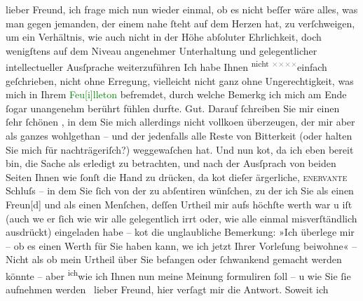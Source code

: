 \pstart
           lieber Freund, ich frage mich nun wieder einmal, ob es nicht beſſer
               wäre alles, was man gegen jemanden, der einem nahe ſteht auf dem Herzen hat, zu
               verſchweigen, um ein Verhältnis, wie auch nicht in der Höhe abſoluter Ehrlichkeit,
               doch wenigſtens auf dem Niveau angenehmer Unterhaltung {\pb}und gelegentlicher intellectueller Ausſprache
                  weiterzuführen{\dotstwo} Ich habe Ihnen \substVorne{}\textsuperscript{nicht \textcolor{gray}{×}\-\textcolor{gray}{×}\-\textcolor{gray}{×}\-\textcolor{gray}{×}}{\allowbreak}\substDazwischen{}einfach geſchrie\substHinten{}ben, nicht ohne Erregung, vielleicht nicht ganz ohne Ungerechtigkeit, was
               mich in Ihrem \textcolor{green}{Feu{[}i{]}lleton}{}\ledrightnote{{$\rightarrow$}\textcolor{green}{Arthur Schnitzler und sein »Reigen«}} befremdet, durch welche Bemerkg ich mich
               am Ende ſogar unangenehm berührt fühlen durfte. Gut. Darauf ſchreiben Sie mir einen
               ſehr {\pb}ſchönen \label{K_L02989-1v}\label{K_L02989-1h}, in dem Sie mich allerdings nicht vollko{\geminationm}en
               überzeugen, der mir aber als ganzes wohlgethan – und der jedenfalls alle Reste von
               Bitterkeit (oder halten Sie mich für nachträgeriſch?) weggewaſchen hat. Und nun ko{\geminationm}t, da ich eben bereit bin, die Sache als erledigt zu
               betrachten, und nach der Ausſprach von beiden Seiten {\pb}Ihnen wie ſonſt die Hand zu drücken, da ko{\geminationm}t dieſer ärgerliche, \textsc{enervante} Schluſs – in dem Sie ſich von der \label{K_L02989-2v}\label{K_L02989-2h} zu abſentiren wünſchen, zu der ich Sie als einen Freun{[}d{]}
               und als einen Menſchen, deſſen Urtheil mir aufs höchſte werth war u iſt (auch we{\geminationn} er ſich wie wir alle {\pb}gelegentlich irrt oder, wie alle einmal
               misverſtändlich ausdrückt) eingeladen habe – ko{\geminationm}t die
               unglaubliche Bemerkung: »Ich überlege mir – ob es einen Werth für Sie haben kann,
                  we{\geminationn} ich jetzt Ihrer Vorleſung beiwohne{\dotstwo}« – Nicht als ob mein Urtheil über Sie befangen oder
               ſchwankend gemacht werden könnte – aber \substVorne{}\textsuperscript{ich}\substDazwischen{}wie\substHinten{} ich Ihnen nun meine {\pb}Meinung
               formuliren ſoll – u wie Sie ſie aufnehmen werden {\dotsfive} lieber Freund, hier verſagt mir die Antwort. Soweit ich
